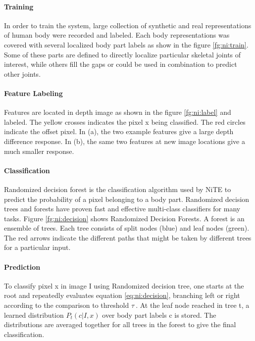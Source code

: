 

\paragraph*{Training} In order to train the system, large collection of synthetic and real representations of human body were recorded and labeled. Each body representations was covered with several localized body part labels as show in the figure \ref{fg:ni:train}. Some of these parts are defined to directly localize particular skeletal joints of interest, while others fill the gaps or could be used in combination to predict other joints.



\paragraph*{Feature Labeling} Features are located in depth image as shown in the figure \ref{fg:ni:label} and labeled. The yellow crosses indicates the pixel x being classified. The red circles indicate the offset pixel. In (a), the two example features give a large depth difference response. In (b), the same two features at new image locations give a much smaller response.



\paragraph*{Classification} Randomized decision forest is the classification algorithm used by NiTE to predict the probability of a pixel belonging to a body part. Randomized decision trees and forests have proven fast and effective multi-class classifiers for many tasks. Figure \ref{fg:ni:decision} shows Randomized Decision Forests. A forest is an ensemble of trees. Each tree consists of split nodes (blue) and leaf nodes (green). The red arrows indicate the different paths that might be taken by different trees for a particular input.



\paragraph*{Prediction} To classify pixel x in image I using Randomized decision tree, one starts at the root and repeatedly evaluates equation \ref{eq:ni:decision}, branching left or right according to the comparison to threshold {$ \tau\ $}. At the leaf node reached in tree t, a learned distribution $ P_{t}(c|I,x) $ over body part labels c is stored. The distributions are averaged together for all trees in the forest to give the final classification.

